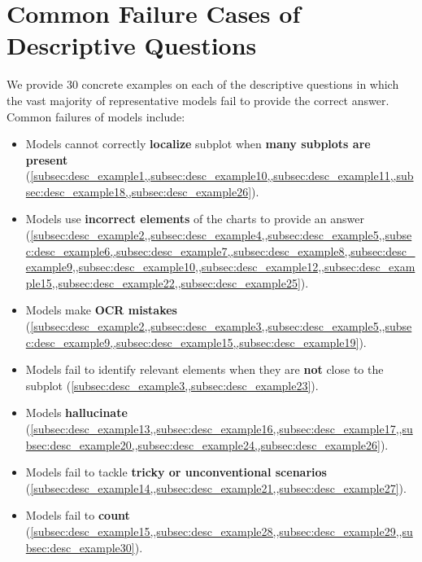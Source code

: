 \newpage
\section{Common Failure Cases of Descriptive Questions}
\label{sec:desc_failure}

We provide 30 concrete examples on each of the descriptive questions in which the vast majority of representative models fail to provide the correct answer. Common failures of models include:
\vspace{-1ex}
\begin{itemize}
    \item Models cannot correctly \textbf{localize} subplot when \textbf{many subplots are present} (\cref{subsec:desc_example1,,subsec:desc_example10,,subsec:desc_example11,,subsec:desc_example18,,subsec:desc_example26}).
    \item Models use \textbf{incorrect elements} of the charts to provide an answer (\cref{subsec:desc_example2,,subsec:desc_example4,,subsec:desc_example5,,subsec:desc_example6,,subsec:desc_example7,,subsec:desc_example8,,subsec:desc_example9,,subsec:desc_example10,,subsec:desc_example12,,subsec:desc_example15,,subsec:desc_example22,,subsec:desc_example25}).
    \item Models make \textbf{OCR mistakes} (\cref{subsec:desc_example2,,subsec:desc_example3,,subsec:desc_example5,,subsec:desc_example9,,subsec:desc_example15,,subsec:desc_example19}).
    \item Models fail to identify relevant elements when they are \textbf{not} close to the subplot (\cref{subsec:desc_example3,,subsec:desc_example23}).
    \item Models \textbf{hallucinate} (\cref{subsec:desc_example13,,subsec:desc_example16,,subsec:desc_example17,,subsec:desc_example20,,subsec:desc_example24,,subsec:desc_example26}).
    \item Models fail to tackle \textbf{tricky or unconventional scenarios} (\cref{subsec:desc_example14,,subsec:desc_example21,,subsec:desc_example27}).
    \item Models fail to \textbf{count} (\cref{subsec:desc_example15,,subsec:desc_example28,,subsec:desc_example29,,subsec:desc_example30}).
\end{itemize}

